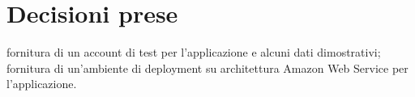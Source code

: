 \documentclass[a4paper,11pt]{article}
\begin{document}
	\section{Decisioni prese}
		\begin{itemize}
			\itemVE fornitura di un account di test per l'applicazione e alcuni dati dimostrativi;
			\itemVE fornitura di un'ambiente di deployment su architettura Amazon Web Service per l'applicazione.
		\end{itemize}
\end{document}
